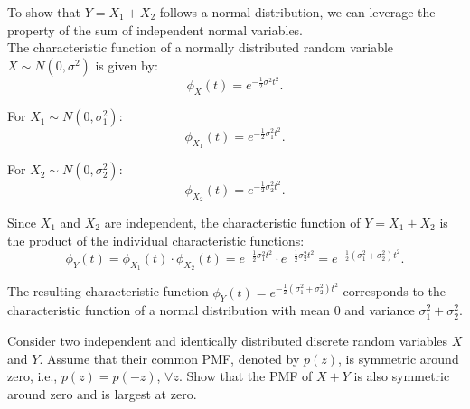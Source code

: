 \begin{solution}
To show that \( Y = X_1 + X_2 \) follows a normal distribution, we can leverage the property of the sum of independent normal variables.\\

   The characteristic function of a normally distributed random variable \( X \sim N(0, \sigma^2) \) is given by:
   \[
   \phi_X(t) = e^{-\frac{1}{2} \sigma^2 t^2}.
   \]

   For \( X_1 \sim N(0, \sigma_1^2) \):
   \[
   \phi_{X_1}(t) = e^{-\frac{1}{2} \sigma_1^2 t^2}.
   \]

   For \( X_2 \sim N(0, \sigma_2^2) \):
   \[
   \phi_{X_2}(t) = e^{-\frac{1}{2} \sigma_2^2 t^2}.
   \]

   Since \( X_1 \) and \( X_2 \) are independent, the characteristic function of \( Y = X_1 + X_2 \) is the product of the individual characteristic functions:
   \[
   \phi_Y(t) = \phi_{X_1}(t) \cdot \phi_{X_2}(t) = e^{-\frac{1}{2} \sigma_1^2 t^2} \cdot e^{-\frac{1}{2} \sigma_2^2 t^2} = e^{-\frac{1}{2} (\sigma_1^2 + \sigma_2^2) t^2}.
   \]

   The resulting characteristic function \( \phi_Y(t) = e^{-\frac{1}{2} (\sigma_1^2 + \sigma_2^2) t^2} \) corresponds to the characteristic function of a normal distribution with mean \( 0 \) and variance \( \sigma_1^2 + \sigma_2^2 \).
\end{solution}

\begin{exercise}
    Consider two independent and identically distributed discrete random variables \( X \) and \( Y \). Assume that their common PMF, denoted by \( p(z) \), is symmetric around zero, i.e., \( p(z) = p(-z) \), \( \forall z \). Show that the PMF of \( X + Y \) is also symmetric around zero and is largest at zero.
\end{exercise}

